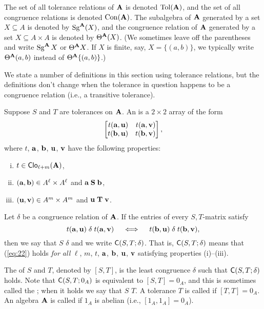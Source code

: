 The set of all tolerance relations of $\mathbf{A}$ is denoted $\operatorname{Tol}(\mathbf{A})$, 
and the set of all congruence relations is denoted $\operatorname{Con}(\mathbf{A})$.
The subalgebra of $\mathbf{A}$ generated by a set $X \subseteq A$ is denoted by
$\operatorname{Sg}^{\mathbf{A}}(X)$, and
the congruence relation of $\mathbf{A}$ generated by a set $X \subseteq A\times A$ is
denoted by $\Theta^{\mathbf{A}}(X)$.
(We sometimes leave off the parentheses and write $\operatorname{Sg}^{\mathbf{A}}X$ or $\Theta^{\mathbf{A}}X$.
If $X$ is finite, say, $X = \{(a,b)\}$, we typically write 
$\Theta^{\mathbf{A}}(a,b)$ instead of $\Theta^{\mathbf{A}}\{(a,b)\}$.)


We state a number of definitions in this section using tolerance relations, but 
the definitions don't change when the tolerance in question happens to be
a congruence relation (i.e., a transitive tolerance).

Suppose $S$ and $T$ are tolerances on $\mathbf{A}$.  An  
is a $2\times 2$ array of the form
\[
\begin{bmatrix*}[r] t(\ba,\bu) & t(\ba,\bv)\\ t(\bb,\bu)&t(\bb,\bv)\end{bmatrix*},
\]
where $t$, $\mathbf{a}$, $\mathbf{b}$, $\mathbf{u}$, $\mathbf{v}$ have the following properties:
\begin{enumerate}[(i)] %
\item $t\in \operatorname{\mathsf{Clo}}_{\ell + m}(\mathbf{A})$,
\item $(\mathbf{a}, \mathbf{b})\in A^\ell\times A^\ell$ and $\mathbf{a} \mathrel{\mathbf{S}} \mathbf{b}$,
\item $(\mathbf{u}, \mathbf{v})\in A^m\times A^m$ and $\mathbf{u} \mathrel{\mathbf{T}} \mathbf{v}$.
\end{enumerate}
Let $\delta$ be a congruence relation of $\mathbf{A}$.
If the entries of every $S,T$-matrix satisfy
\begin{equation}
  \label{eq:22}
t(\mathbf{a},\mathbf{u}) \mathrel{\delta} t(\mathbf{a},\mathbf{v})\quad \iff \quad t(\mathbf{b},\mathbf{u}) \mathrel{\delta} t(\mathbf{b},\mathbf{v}),
\end{equation}
then we say that $S$  $\delta$ and we write 
$\mathsf{C}(S, T; \delta)$.
That is, $\mathsf{C}(S, T; \delta)$  means that 
(\ref{eq:22}) holds \emph{for all}
$\ell$, $m$, $t$, $\mathbf{a}$, $\mathbf{b}$, $\mathbf{u}$, $\mathbf{v}$ satisfying properties (i)--(iii).

The  of $S$ and $T$, denoted by $[S, T]$,
is the least congruence $\delta$ such that $\mathsf{C}(S, T; \delta)$ 
holds.  
Note that $\mathsf{C}(S, T; 0_A)$ is equivalent to $[S,T] = 0_A$, and this
is sometimes called the ;
when it holds we say  that
$S$  $T$. %
A tolerance $T$ is called  if
$[T, T] = 0_A$.  
An algebra $\mathbf{A}$ is called  if $1_A$ is abelian
(i.e., $[1_A,1_A] = 0_A$).


